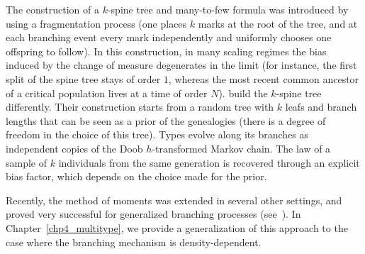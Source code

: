 The construction of a $k$-spine tree and many-to-few formula was introduced by~\cite{Harris_Roberts} using a fragmentation process (one places $k$ marks at the root of the tree, and at each branching event every mark independently and uniformly chooses one offspring to follow). In this construction, in many scaling regimes the bias induced by the change of measure degenerates in the limit (for instance, the first split of the spine tree stays of order $1$, whereas the most recent common ancestor of a critical population lives at a time of order $N$).
\citet*{Foutel_Schertzer} build the $k$-spine tree differently. Their construction starts from a random tree with $k$ leafs and \iid branch lengths that can be seen as a prior of the genealogies (there is a degree of freedom in the choice of this tree). Types evolve along its branches as independent copies of the Doob $h$-transformed Markov chain. The law of a sample of $k$ individuals from the same generation is recovered through an explicit bias factor, which depends on the choice made for the prior.

Recently, the method of moments was extended in several other settings, and proved very successful for generalized branching processes (see~\cite{ harris_coalescent_2020,  boenkost2022genealogy,  Foutel_Schertzer, FST_Semipushed_2024, harris_coalescent_2024, harris_universality_2024, harris_many--few_2024,foutelrodier2024momentapproachconvergencespatial,schertzer2023spectral}). In Chapter~\ref{chp4_multitype}, we provide a generalization of this approach to the case where the branching mechanism is density-dependent.
